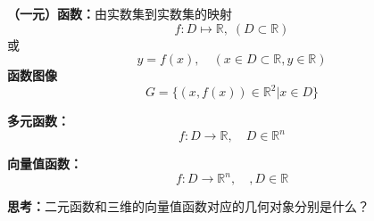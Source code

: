 	{\bf （一元）函数：}由实数集到实数集的映射
	$$f:D\mapsto\mathbb{R},\;(D\subset\mathbb{R})$$
	或
	$$y=f(x),\quad (x\in D\subset\mathbb{R},y\in\mathbb{R})$$
	{\bf 函数图像}
	$$G=\{(x,f(x))\in\mathbb{R}^2|x\in D\}$$
	
	\begin{shaded}
		{\bf 多元函数：} 
		$$f:D\to\mathbb{R},\quad D\in\mathbb{R}^n$$
		
		{\bf 向量值函数：}
		$$f:D\to\mathbb{R}^n,\quad, D\in\mathbb{R}$$
		
		{\bf 思考：}二元函数和三维的向量值函数对应的几何对象分别是什么？
		
	\end{shaded}	
	\begin{center}
		\quad	
	\end{center}
	
